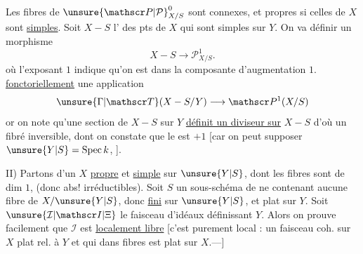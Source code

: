 Les fibres de $\unsure{\mathscr P|\mathcal P}^0_{X/S}$ sont connexes, et propres si celles de $X$ sont \uline{simples}. Soit  $X-S$ l’ des pts de $X$ qui sont  simples sur $Y$. On va définir un morphisme
\[
\boxed{X-S\longrightarrow\mathscr P^1_{X/S}}.
\]
où l’exposant $1$ indique qu’on est dans la composante d’augmentation $1$.   \uline{fonctoriellement}  une application
\[
\unsure{\Gamma|\mathscr T}(X-S/Y)\longrightarrow\mathscr P^1(X/S)
\]
or on note qu’une section de $X-S$ sur $Y$ \uline{définit un diviseur sur} $X-S$  d’où un fibré inversible, dont on constate que le   est $+1$ [car on peut supposer $\unsure{Y|S}=\operatorname{Spec}k$, ].

II) Partons d’un $X$ \uline{propre} et \uline{simple} sur $\unsure{Y|S}$, dont les fibres sont de dim $1$,   (donc abs! irréductibles). Soit $S$ un sous-schéma  de  ne contenant aucune fibre de $X/\unsure{Y|S}$, donc \uline{fini} sur $\unsure{Y|S}$, et plat sur $Y$. Soit $\unsure{\mathcal I|\mathscr I|\Xi}$ le faisceau d’idéaux définissant $Y$. Alors on prouve facilement que $\mathcal I$ est \uline{localement libre} [c’est purement local : un faisceau coh. sur $X$ plat rel. à $Y$ et qui  dans fibres  est plat sur $X$.---]
